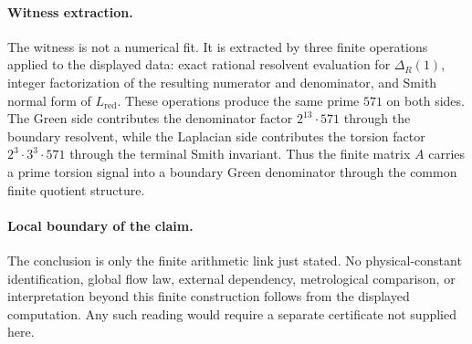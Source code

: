 \paragraph{Witness extraction.}
The witness is not a numerical fit. It is extracted by three finite operations applied to the displayed data: exact rational resolvent evaluation for $\Delta_R(1)$, integer factorization of the resulting numerator and denominator, and Smith normal form of $L_{\mathrm{red}}$. These operations produce the same prime $571$ on both sides. The Green side contributes the denominator factor $2^{13}\cdot 571$ through the boundary resolvent, while the Laplacian side contributes the torsion factor $2^3\cdot 3^3\cdot 571$ through the terminal Smith invariant. Thus the finite matrix $A$ carries a prime torsion signal into a boundary Green denominator through the common finite quotient structure.

\paragraph{Local boundary of the claim.}
The conclusion is only the finite arithmetic link just stated. No physical-constant identification, global flow law, external dependency, metrological comparison, or interpretation beyond this finite construction follows from the displayed computation. Any such reading would require a separate certificate not supplied here.
